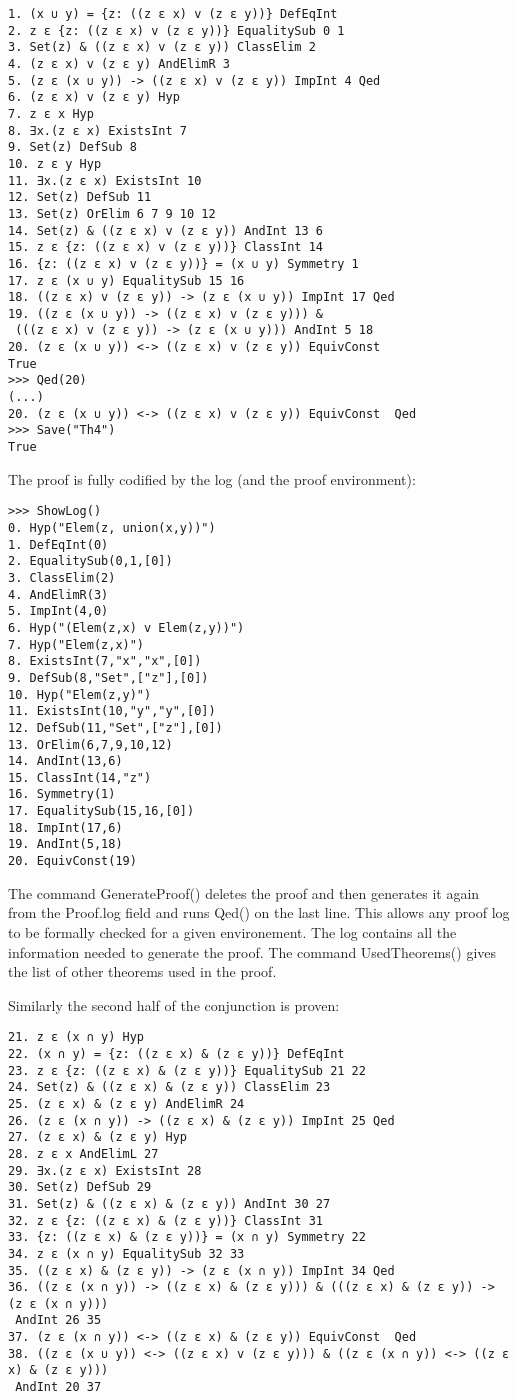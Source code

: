 \documentclass[a4paper,12pt,leqno]{article}
\numberwithin{equation}{section}
\begin{document}
\begin{verbatim}
1. (x ∪ y) = {z: ((z ε x) v (z ε y))} DefEqInt 
2. z ε {z: ((z ε x) v (z ε y))} EqualitySub 0 1
3. Set(z) & ((z ε x) v (z ε y)) ClassElim 2
4. (z ε x) v (z ε y) AndElimR 3
5. (z ε (x ∪ y)) -> ((z ε x) v (z ε y)) ImpInt 4 Qed
6. (z ε x) v (z ε y) Hyp 
7. z ε x Hyp 
8. ∃x.(z ε x) ExistsInt 7
9. Set(z) DefSub 8
10. z ε y Hyp 
11. ∃x.(z ε x) ExistsInt 10
12. Set(z) DefSub 11
13. Set(z) OrElim 6 7 9 10 12
14. Set(z) & ((z ε x) v (z ε y)) AndInt 13 6
15. z ε {z: ((z ε x) v (z ε y))} ClassInt 14
16. {z: ((z ε x) v (z ε y))} = (x ∪ y) Symmetry 1
17. z ε (x ∪ y) EqualitySub 15 16
18. ((z ε x) v (z ε y)) -> (z ε (x ∪ y)) ImpInt 17 Qed
19. ((z ε (x ∪ y)) -> ((z ε x) v (z ε y))) &
 (((z ε x) v (z ε y)) -> (z ε (x ∪ y))) AndInt 5 18
20. (z ε (x ∪ y)) <-> ((z ε x) v (z ε y)) EquivConst 
True
>>> Qed(20)
(...)
20. (z ε (x ∪ y)) <-> ((z ε x) v (z ε y)) EquivConst  Qed
>>> Save("Th4")
True
\end{verbatim}

The proof is fully codified by the log (and the proof environment):

\begin{verbatim}
>>> ShowLog()
0. Hyp("Elem(z, union(x,y))")
1. DefEqInt(0)
2. EqualitySub(0,1,[0])
3. ClassElim(2)
4. AndElimR(3)
5. ImpInt(4,0)
6. Hyp("(Elem(z,x) v Elem(z,y))")
7. Hyp("Elem(z,x)")
8. ExistsInt(7,"x","x",[0])
9. DefSub(8,"Set",["z"],[0])
10. Hyp("Elem(z,y)")
11. ExistsInt(10,"y","y",[0])
12. DefSub(11,"Set",["z"],[0])
13. OrElim(6,7,9,10,12)
14. AndInt(13,6)
15. ClassInt(14,"z")
16. Symmetry(1)
17. EqualitySub(15,16,[0])
18. ImpInt(17,6)
19. AndInt(5,18)
20. EquivConst(19)
\end{verbatim}	

The command GenerateProof() deletes the proof and then generates it again from the Proof.log  field and runs Qed() on the last line. This allows
any proof log to be formally checked for a given environement. The log  contains all the information needed to generate the proof.
The command UsedTheorems() gives the list of other theorems used in the proof.

Similarly the second half of the conjunction is proven:

\begin{verbatim}
21. z ε (x ∩ y) Hyp 
22. (x ∩ y) = {z: ((z ε x) & (z ε y))} DefEqInt 
23. z ε {z: ((z ε x) & (z ε y))} EqualitySub 21 22
24. Set(z) & ((z ε x) & (z ε y)) ClassElim 23
25. (z ε x) & (z ε y) AndElimR 24
26. (z ε (x ∩ y)) -> ((z ε x) & (z ε y)) ImpInt 25 Qed
27. (z ε x) & (z ε y) Hyp 
28. z ε x AndElimL 27
29. ∃x.(z ε x) ExistsInt 28
30. Set(z) DefSub 29
31. Set(z) & ((z ε x) & (z ε y)) AndInt 30 27
32. z ε {z: ((z ε x) & (z ε y))} ClassInt 31
33. {z: ((z ε x) & (z ε y))} = (x ∩ y) Symmetry 22
34. z ε (x ∩ y) EqualitySub 32 33
35. ((z ε x) & (z ε y)) -> (z ε (x ∩ y)) ImpInt 34 Qed
36. ((z ε (x ∩ y)) -> ((z ε x) & (z ε y))) & (((z ε x) & (z ε y)) -> (z ε (x ∩ y)))
 AndInt 26 35
37. (z ε (x ∩ y)) <-> ((z ε x) & (z ε y)) EquivConst  Qed
38. ((z ε (x ∪ y)) <-> ((z ε x) v (z ε y))) & ((z ε (x ∩ y)) <-> ((z ε x) & (z ε y)))
 AndInt 20 37
\end{verbatim}	
\end{document}
